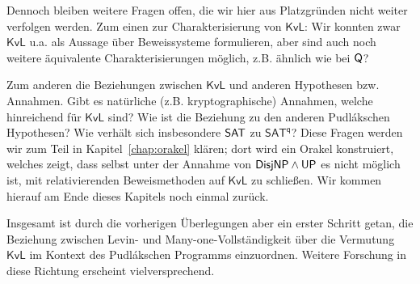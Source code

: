 

Dennoch bleiben weitere Fragen offen, die wir hier aus Platzgründen nicht weiter verfolgen werden. 
Zum einen zur Charakterisierung von $\mathsf{KvL}$:
Wir konnten zwar $\mathsf{KvL}$ u.a. als Aussage über Beweissysteme formulieren, aber sind auch noch weitere äquivalente Charakterisierungen möglich, z.B. ähnlich wie bei $\mathsf{Q}$?

Zum anderen die Beziehungen zwischen $\mathsf{KvL}$ und anderen Hypothesen bzw. Annahmen.
Gibt es natürliche (z.B. kryptographische) Annahmen, welche hinreichend für $\mathsf{KvL}$ sind? Wie ist die Beziehung zu den anderen Pudlákschen Hypothesen? Wie verhält sich insbesondere $\mathsf{SAT}$ zu $\mathsf{SAT^{q}}$? 
Diese Fragen werden wir zum Teil in Kapitel~\ref{chap:orakel} klären; dort wird ein Orakel konstruiert, welches zeigt, dass selbst unter der Annahme von $\mathsf{DisjNP}\land\mathsf{UP}$ es nicht möglich ist, mit relativierenden Beweismethoden auf $\mathsf{KvL}$ zu schließen.
Wir kommen hierauf am Ende dieses Kapitels noch einmal zurück.

Insgesamt ist durch die vorherigen Überlegungen aber ein erster Schritt getan, die Beziehung zwischen Levin- und Many-one-Vollständigkeit über die Vermutung $\mathsf{KvL}$ im Kontext des Pudlákschen Programms einzuordnen.
Weitere Forschung in diese Richtung erscheint vielversprechend.

